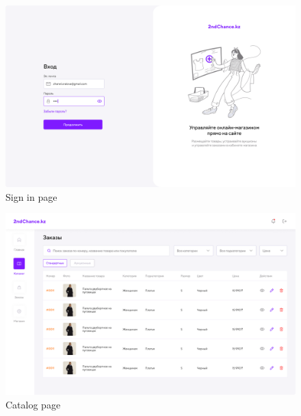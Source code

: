 \begin{figure}[h!]
    \centering
    \includegraphics[scale=0.3]{figures/Sign in password active.png}
    \caption{Sign in page}
    \label{fig:sign-in}
\end{figure}
\begin{figure}[h!]
    \centering
    \includegraphics[scale=0.3]{figures/Catalogue Filled.png}
    \caption{Catalog page}
    \label{fig:catalogue page}
\end{figure}

